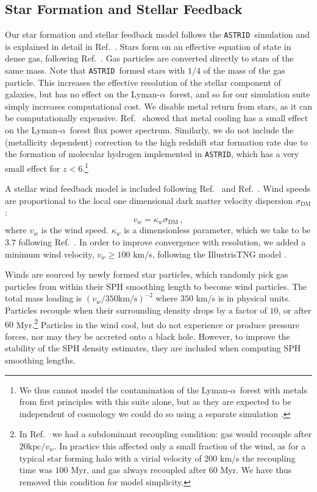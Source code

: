 \documentclass[a4paper,11pt]{article}
\newcommand{\Lya}{Lyman-$\alpha$}
\newcommand{\astrid}{\texttt{ASTRID}}
\begin{document}
\subsection{Star Formation and Stellar Feedback}
\label{sec:stellar}

Our star formation and stellar feedback model follows the \astrid~simulation and is explained in detail in Ref.~\cite{Bird:2022}.
Stars form on an effective equation of state in dense gas, following Ref.~\cite{Springel:2003}. Gas particles are converted directly to stars of the same mass. Note that \astrid~formed stars with $1/4$ of the mass of the gas particle. This increases the effective resolution of the stellar component of galaxies, but has no effect on the \Lya~forest, and so for our simulation suite simply increases computational cost. We disable metal return from stars, as it can be computationally expensive. Ref.~\cite{Viel:2013} showed that metal cooling has a small effect on the \Lya~forest flux power spectrum. Similarly, we do not include the (metallicity dependent) correction to the high redshift star formation rate due to the formation of molecular hydrogen implemented in \astrid, which has a very small effect for $z < 6$.\footnote{We thus cannot model the contamination of the \Lya~forest with metals from first principles with this suite alone, but as they are expected to be independent of cosmology we could do so using a separate simulation \cite[e.g. ASTRID~][]{Ni:2021, Bird:2022}.} %

A stellar wind feedback model is included following Ref.~\citep{Okamoto:2010} and Ref.~\cite{Bird:2022}. Wind speeds are proportional to the local one dimensional dark matter velocity dispersion $\sigma_\mathrm{DM}$:
\begin{equation}
v_w = \kappa_w \sigma_\mathrm{DM} \,,
\end{equation}
where $v_w$ is the wind speed. $\kappa_w$ is a dimensionless parameter, which we take to be $3.7$ following Ref.~\cite{Vogelsberger:2013}. In order to improve convergence with resolution, we added a minimum wind velocity, $v_w \geq 100$ km/s, following the IllustrisTNG model \cite{Pillepich:2018}.

Winds are sourced by newly formed star particles, which randomly pick gas particles from within their SPH smoothing length to become wind particles. The total mass loading is $(v_w/ 350 \mathrm{km/s})^{-2}$ where $350$ km/s is in physical units. Particles recouple when their surrounding density drops by a factor of $10$, or after $60$ Myr.\footnote{In Ref.~\cite{Bird:2022} we had a subdominant recoupling condition: gas would recouple after $20 \mathrm{kpc} / v_w$. In practice this affected only a small fraction of the wind, as for a typical star forming halo with a virial velocity of $200$ km/s the recoupling time was $100$ Myr, and gas always recoupled after $60$ Myr. We have thus removed this condition for model simplicity.} Particles in the wind cool, but do not experience or produce pressure forces, nor may they be accreted onto a black hole. However, to improve the stability of the SPH density estimates, they are included when computing SPH smoothing lengths.
\end{document}
